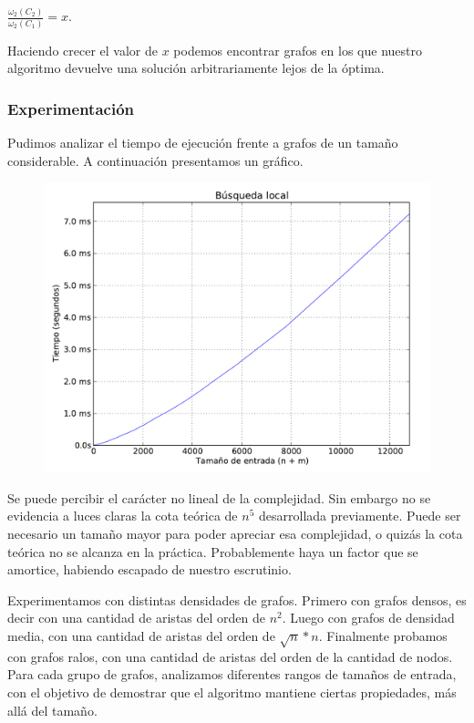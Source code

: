 $\frac{\omega_2(C_2)}{\omega_2(C_1)} = x$.

Haciendo crecer el valor de $x$ podemos encontrar grafos en los que nuestro algoritmo devuelve una
solución arbitrariamente lejos de la óptima.

\newpage
\subsubsection{Experimentación}

Pudimos analizar el tiempo de ejecución frente a grafos de un tamaño considerable. A continuación presentamos un gráfico.

\begin{figure}[H]
\begin{center}
\includegraphics[angle=0, scale=.75]{imagenes/local_search_time.pdf}
\label{grafico local}
\end{center}
\end{figure}


Se puede percibir el carácter no lineal de la complejidad. Sin embargo no se evidencia a luces claras la cota teórica de $n^5$ desarrollada
previamente. Puede ser necesario un tamaño mayor para poder apreciar esa complejidad, o quizás la cota teórica no se alcanza en la práctica.
Probablemente haya un factor que se amortice, habiendo escapado de nuestro escrutinio.

Experimentamos con distintas densidades de grafos. Primero con grafos densos, es decir con una cantidad de aristas del orden de $n^2$. Luego con
grafos de densidad media, con una cantidad de aristas del orden de $\sqrt{n}*n$. Finalmente probamos con grafos ralos, con una cantidad de aristas
del orden de la cantidad de nodos. Para cada grupo de grafos, analizamos diferentes rangos de tamaños de entrada, con el objetivo de demostrar
que el algoritmo mantiene ciertas propiedades, más allá del tamaño.

